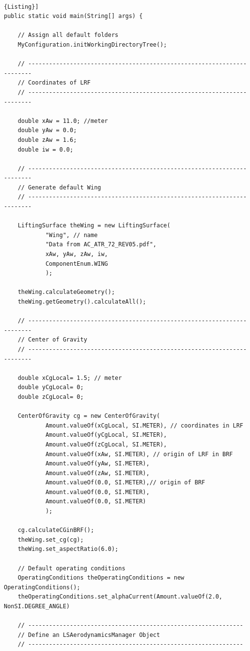 \noindent \\
\begin{lstlisting}[frame=rbl,caption={{\footnotesize Generation of an isolated Wing}},label= [style=\bfseries]{Listing}]
public static void main(String[] args) {

	// Assign all default folders
	MyConfiguration.initWorkingDirectoryTree();
	
	// -----------------------------------------------------------------------
	// Coordinates of LRF
	// -----------------------------------------------------------------------
	
	double xAw = 11.0; //meter 
	double yAw = 0.0;
	double zAw = 1.6;
	double iw = 0.0;
	
	// -----------------------------------------------------------------------
	// Generate default Wing
	// -----------------------------------------------------------------------
	
	LiftingSurface theWing = new LiftingSurface(
			"Wing", // name
			"Data from AC_ATR_72_REV05.pdf", 
			xAw, yAw, zAw, iw, 
			ComponentEnum.WING
			); 

	theWing.calculateGeometry();
	theWing.getGeometry().calculateAll();
	
	// -----------------------------------------------------------------------
	// Center of Gravity
	// -----------------------------------------------------------------------	
	
	double xCgLocal= 1.5; // meter 
	double yCgLocal= 0;
	double zCgLocal= 0;

	CenterOfGravity cg = new CenterOfGravity(
			Amount.valueOf(xCgLocal, SI.METER), // coordinates in LRF
			Amount.valueOf(yCgLocal, SI.METER),
			Amount.valueOf(zCgLocal, SI.METER),
			Amount.valueOf(xAw, SI.METER), // origin of LRF in BRF 
			Amount.valueOf(yAw, SI.METER),
			Amount.valueOf(zAw, SI.METER),
			Amount.valueOf(0.0, SI.METER),// origin of BRF
			Amount.valueOf(0.0, SI.METER),
			Amount.valueOf(0.0, SI.METER)
			);

	cg.calculateCGinBRF();
	theWing.set_cg(cg);
	theWing.set_aspectRatio(6.0);

	// Default operating conditions
	OperatingConditions theOperatingConditions = new OperatingConditions();		
	theOperatingConditions.set_alphaCurrent(Amount.valueOf(2.0, NonSI.DEGREE_ANGLE)

	// --------------------------------------------------------------
	// Define an LSAerodynamicsManager Object
	// --------------------------------------------------------------
	

\end{lstlisting}
